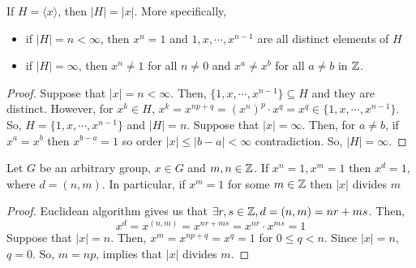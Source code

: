 \documentclass[12pt, a4paper, openany, twoside]{book}
\theoremstyle{definition}
\theoremstyle{remark}
\theoremstyle{plain}
\numberwithin{equation}{section}
\begin{document}
\begin{tcolorbox}[colback=yellow!10!white,colframe=green!75!black,title=Proposition]

If $H = \langle x \rangle$, then $|H| = |x|$. More specifically, 
\begin{itemize}
    \item if $|H| = n < \infty$, then $x^n = 1$ and $1, x, \cdots, x^{n-1}$ are all distinct elements of $H$
    \item if $|H| = \infty$, then $x^n \neq 1$ for all $n \neq 0$ and $x^a \neq x^b$ for all $a \neq b$ in ${\mathbb {Z}}$. 
\end{itemize}

\end{tcolorbox}

\begin{proof}
    
Suppose that $|x| = n < \infty$. Then, $\{1, x, \cdots, x^{n-1}\} \subseteq H$ and they are distinct. 
However, for $x^k \in H$, $x^k = x^{np + q} = (x^n)^p \cdot x^q = x^q \in \{1, x, \cdots, x^{n-1}\}$. So, $H = \{1, x, \cdots, x^{n-1}\}$ and $|H| = n$. 
Suppose that $|x| = \infty$. Then, for $a \neq b$, if $x^a = x^b$ then $x^{b - a} = 1$ so order $|x| \leq |b-a| < \infty$ contradiction. So, $|H| = \infty$. 

\end{proof}

\begin{tcolorbox}[colback=yellow!10!white,colframe=green!75!black,title=Proposition]

Let $G$ be an arbitrary group, $x \in G$ and $m, n \in {\mathbb {Z}}$. If $x^n = 1, x^m = 1$ then 
$x^d = 1$, where $d = (n, m)$. In particular, if $x^m = 1$ for some $m \in {\mathbb {Z}}$ then $|x|$ divides $ m$

\end{tcolorbox}

\begin{proof}
    
Euclidean algorithm gives us that $\exists r, s \in {\mathbb {Z}}, d = (n, m) = nr + ms$. Then, 
\[x^d = x^{(n,m)} = x^{nr + ms} = x^{nr} \cdot x^{ms} = 1\]
Suppose that $|x| = n$. Then, $x^m = x^{np + q} = x^q = 1$ for $0 \leq q < n$. Since $|x| = n$, $q = 0$. So, $m = np$, implies that $|x|$ divides $m$. 

\end{proof}
\end{document}
